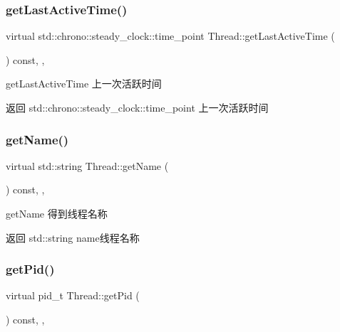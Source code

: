 \subsubsection{\texorpdfstring{get\+Last\+Active\+Time()}{getLastActiveTime()}}
{\footnotesize\ttfamily virtual std\+::chrono\+::steady\+\_\+clock\+::time\+\_\+point Thread\+::get\+Last\+Active\+Time (\begin{DoxyParamCaption}{ }\end{DoxyParamCaption}) const\hspace{0.3cm}{\ttfamily [inline]}, {\ttfamily [final]}, {\ttfamily [virtual]}}



get\+Last\+Active\+Time 上一次活跃时间 

\begin{DoxyReturn}{返回}
std\+::chrono\+::steady\+\_\+clock\+::time\+\_\+point 上一次活跃时间 
\end{DoxyReturn}
\mbox{\label{classThread_a19bc237f8a86727a5a4b516122fe20f6}} 
\subsubsection{\texorpdfstring{get\+Name()}{getName()}}
{\footnotesize\ttfamily virtual std\+::string Thread\+::get\+Name (\begin{DoxyParamCaption}{ }\end{DoxyParamCaption}) const\hspace{0.3cm}{\ttfamily [inline]}, {\ttfamily [final]}, {\ttfamily [virtual]}}



get\+Name 得到线程名称 

\begin{DoxyReturn}{返回}
std\+::string name线程名称 
\end{DoxyReturn}
\mbox{\label{classThread_ad7fd4dfa0edff93d118b2edf5ab7be2c}} 
\subsubsection{\texorpdfstring{get\+Pid()}{getPid()}}
{\footnotesize\ttfamily virtual pid\+\_\+t Thread\+::get\+Pid (\begin{DoxyParamCaption}{ }\end{DoxyParamCaption}) const\hspace{0.3cm}{\ttfamily [inline]}, {\ttfamily [final]}, {\ttfamily [virtual]}}



